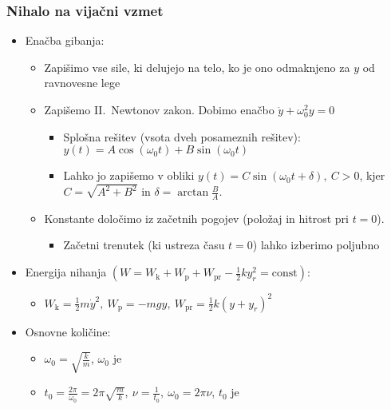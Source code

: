 \subsubsection*{Nihalo na vijačni vzmet}
\begin{itemize}
    \item Enačba gibanja:
    \begin{itemize}
        \item Zapišimo vse sile, ki delujejo na telo, ko je ono odmaknjeno za \(y\) od ravnovesne lege
        \item Zapišemo II.\ Newtonov zakon. Dobimo enačbo \(\ddot{y} + \omega_0^2y = 0\)
        \begin{itemize}
            \item Splošna rešitev (vsota dveh posameznih rešitev): \(y(t) = A \cos (\omega_0t) + B \sin (\omega_0t)\)
            \item Lahko jo zapišemo v obliki \(y(t) = C \sin(\omega_0 t + \delta), \ C > 0\), kjer \(C = \sqrt{A^2 + B^2}\) in \(\delta = \arctan \frac{B}{A}\).
        \end{itemize}
        \item Konstante določimo iz začetnih pogojev (položaj in hitrost pri \(t = 0\)). 
        \begin{itemize}
            \item Začetni trenutek (ki ustreza času \(t = 0\)) lahko izberimo poljubno
        \end{itemize}
    \end{itemize}
    \item Energija nihanja \((W = W_\text{k} + W_\text{p} + W_\text{pr} - \frac{1}{2} k y_r^2 = \text{const})\):
    \begin{itemize}
        \item \(W_\text{k} = \frac{1}{2}m \dot{y}^2, \  W_\text{p} = -mgy, \ W_\text{pr} = \frac{1}{2}k (y + y_r)^2\)
    \end{itemize}
    \item Osnovne količine:
    \begin{itemize}
        \item \(\omega_0 = \sqrt{\frac{k}{m}}\), \(\omega_0\) je 
        \item \(t_0 = \frac{2 \pi}{\omega_0} = 2 \pi \sqrt{\frac{m}{k}}, \ \nu = \frac{1}{t_0}, \ \omega_0 = 2 \pi \nu\), \(t_0\) je 
    \end{itemize}
\end{itemize}

